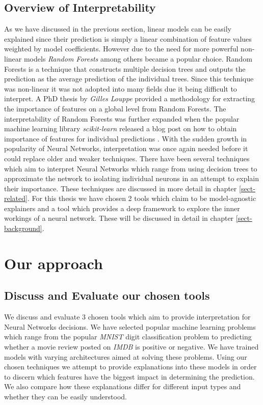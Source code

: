 \subsection{Overview of Interpretability}
As we have discussed in the previous section, linear models can be easily explained since their prediction is simply a linear combination of feature values weighted by model coefficients. However due to the need for more powerful non-linear models \emph{Random Forests} \cite{inbookb} among others  became a popular choice. Random Forests is a technique that constructs multiple decision trees and outputs the prediction as the average prediction of the individual trees. Since this technique was non-linear it was not adopted into many fields due it being difficult to interpret. A PhD thesis by \emph{Gilles Louppe} \cite{louppe2015understanding}  provided a methodology for extracting the  importance of features on a global level from Random Forests. The interpretability of Random Forests was further expanded when the popular machine learning library \emph{scikit-learn} released a blog post on how to obtain importance of features for individual predictions \cite{RandomData}. With the sudden growth in popularity of Neural Networks, interpretation was once again needed before it could replace older and weaker techniques. There have been several techniques which aim to interpret Neural Networks which range from using decision trees to approximate the network to isolating individual neurons in an attempt to explain their importance. These techniques are discussed in more detail in chapter \ref{sect-related}. For this thesis we have chosen 2 tools which claim to be model-agnostic explainers and a tool which provides a deep framework to explore the inner workings of a neural network. These will be discussed in detail in chapter \ref{sect-background}.

\section{Our approach}
\subsection{Discuss and Evaluate our chosen tools}
We discuss and evaluate 3 chosen tools which aim to provide interpretation for Neural Networks decisions. We have selected popular machine learning problems which range from the popular \emph{MNIST} digit classification problem to predicting whether a movie review posted on \emph{IMDB} is positive or negative. We have trained models with varying architectures aimed at solving these problems. Using our chosen techniques we attempt to provide explanations into these models in order to discern which features have the biggest impact in determining the prediction. We also compare how these explanations differ for different input types and whether they can be easily understood.


